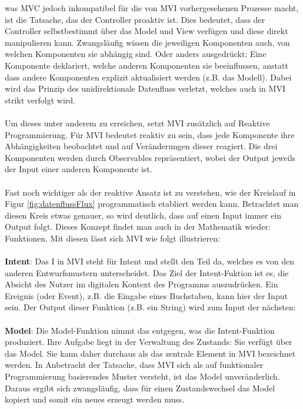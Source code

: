 was MVC jedoch inkompatibel für die von MVI vorhergesehenen Prozesse macht, ist die Tatsache, das der Controller proaktiv ist. Dies bedeutet, dass der Controller selbstbestimmt über das Model und View verfügen und diese direkt manipulieren kann. Zwangsläufig wissen die jeweiligen Komponenten auch, von welchen Komponenten sie abhängig sind. Oder anders ausgedrückt: Eine Komponente deklariert, welche anderen Komponenten sie beeinflussen, anstatt dass andere Komponenten explizit aktualisiert werden (z.B. das Modell). Dabei wird das Prinzip des unidirektionale Datenfluss verletzt, welches auch in MVI strikt verfolgt wird. 
\\
\\
Um dieses unter anderem zu erreichen, setzt MVI zusätzlich auf Reaktive Programmierung. Für MVI bedeutet reaktiv zu sein, dass jede Komponente ihre Abhängigkeiten beobachtet und auf Veränderungen dieser reagiert. Die drei Komponenten werden durch Observables repräsentiert, wobei der Output jeweils der Input einer anderen Komponente ist.
\\
\\
Fast noch wichtiger als der reaktive Ansatz ist zu verstehen, wie der Kreislauf in Figur \ref{fig:datenflussFlux} programmatisch etabliert werden kann. Betrachtet man diesen Kreis etwas genauer, so wird deutlich, dass auf einen Input immer ein Output folgt. Dieses Konzept findet man auch in der Mathematik wieder: Funktionen. Mit diesen lässt sich MVI wie folgt illustrieren:
\\
\\
\textbf{Intent}: Das I in MVI steht für Intent und stellt den Teil da, welches es von den anderen Entwurfsmustern unterscheidet. Das Ziel der Intent-Fuktion ist es, die Absicht des Nutzer im digitalen Kontext des Programms auszudrücken.
Ein Ereignis (oder Event), z.B. die Eingabe eines Buchstaben, kann hier der Input sein.
Der Output dieser Funktion (z.B. ein String) wird zum Input der nächsten:
\\
\\
\textbf{Model}: Die Model-Funktion nimmt das entgegen, was die Intent-Funktion produziert. Ihre Aufgabe liegt in der Verwaltung des Zustands: Sie verfügt über das Model. Sie kann daher durchaus als das zentrale Element in MVI bezeichnet werden. In Anbetracht der Tatsache, dass MVI sich als auf funktionaler Programmierung basierendes Muster versteht, ist das Model unveränderlich. Daraus ergibt sich zwangsläufig, dass für einen Zustandswechsel das Model kopiert und somit ein neues erzeugt werden muss. 
\\
